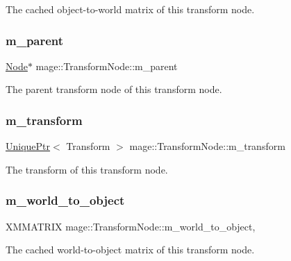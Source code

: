 The cached object-\/to-\/world matrix of this transform node. \hypertarget{classmage_1_1_transform_node_afad4b8198a5e4b1a3c46fb8e51fd17c2}{}\label{classmage_1_1_transform_node_afad4b8198a5e4b1a3c46fb8e51fd17c2} 
\subsubsection{\texorpdfstring{m\+\_\+parent}{m\_parent}}
{\footnotesize\ttfamily \hyperlink{classmage_1_1_node}{Node}$\ast$ mage\+::\+Transform\+Node\+::m\+\_\+parent\hspace{0.3cm}{\ttfamily [private]}}

The parent transform node of this transform node. \hypertarget{classmage_1_1_transform_node_ac601e39377f706442da334e040adaab3}{}\label{classmage_1_1_transform_node_ac601e39377f706442da334e040adaab3} 
\subsubsection{\texorpdfstring{m\+\_\+transform}{m\_transform}}
{\footnotesize\ttfamily \hyperlink{namespacemage_a8c307fbcc33bce9b7f2aa4c26c3b95cf}{Unique\+Ptr}$<$ Transform $>$ mage\+::\+Transform\+Node\+::m\+\_\+transform\hspace{0.3cm}{\ttfamily [private]}}

The transform of this transform node. \hypertarget{classmage_1_1_transform_node_ade413fc9a980ce8e1191c17f94f25e3f}{}\label{classmage_1_1_transform_node_ade413fc9a980ce8e1191c17f94f25e3f} 
\subsubsection{\texorpdfstring{m\+\_\+world\+\_\+to\+\_\+object}{m\_world\_to\_object}}
{\footnotesize\ttfamily X\+M\+M\+A\+T\+R\+IX mage\+::\+Transform\+Node\+::m\+\_\+world\+\_\+to\+\_\+object\hspace{0.3cm}{\ttfamily [mutable]}, {\ttfamily [private]}}

The cached world-\/to-\/object matrix of this transform node. 